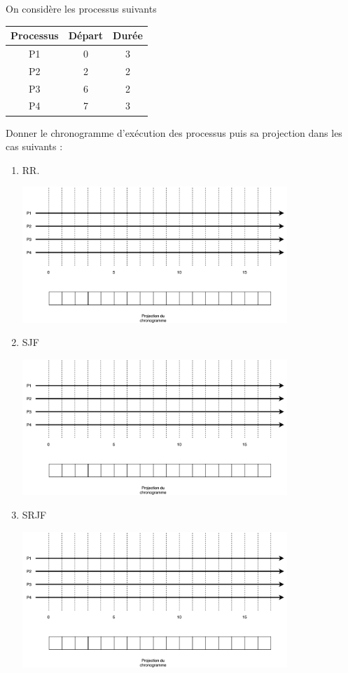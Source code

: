 \documentclass[a4paper,12pt,french]{article}
\begin{document}
On considère les processus suivants
\begin{center}
\begin{tabular}{|c|c|c|}
\hline\rowcolor{UGLiOrange}
\textbf{\color{white} Processus} & \textbf{\color{white}Départ} & \textbf{\color{white}Durée} \\
\hline
P1 & 0 & 3 \\
\hline
P2 & 2 & 2 \\
\hline
P3 & 6 & 2 \\
\hline
P4 & 7 & 3 \\
\hline
\end{tabular}
\end{center}
Donner le chronogramme d'exécution des processus puis sa projection dans les cas suivants :
\begin{enumerate}[\bfseries 1.]
	\item 	RR.
    \begin{center}
                     \includegraphics[width=10cm]{img/mc}\\
                     \end{center}
    \newpage
    
	\item 	SJF
    \begin{center}
                     \includegraphics[width=10cm]{img/mc}\\
                     \end{center}
    \item SRJF
    \begin{center}
                     \includegraphics[width=10cm]{img/mc}\\
                     \end{center}
    \end{enumerate}
\end{document}

